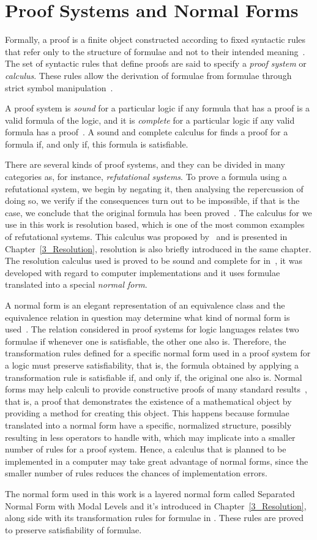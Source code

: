\section{Proof Systems and Normal Forms}

Formally, a proof is a finite object constructed according
to fixed syntactic rules that refer only to the structure of formulae and not to
their intended meaning~\cite{fitting}. The set of syntactic rules that define
proofs are said to specify a \emph{proof system} or \emph{calculus}. These rules
allow the derivation of formulae from formulae through strict symbol
manipulation~\cite{resolutionbased}.

A proof system is \emph{sound} for a particular logic if any formula that has a
proof is a valid formula of the logic, and it is \emph{complete} for a
particular logic if any valid formula has a proof~\cite{fitting}. A sound and
complete calculus for  finds a proof for a formula if, and only
if, this formula is satisfiable.

There are several kinds of proof systems, and they can be divided in many
categories as, for instance, \emph{refutational systems}. To prove a formula
using a refutational system, we begin by negating it, then analysing the
repercussion %
of doing so, we verify if the consequences turn out to be impossible, if that is
the case, we conclude that the original formula has been proved~\cite{fitting}.
The calculus for  we use in this work is resolution based,
which is one of the most common examples of refutational systems. This calculus
was proposed by~\cite{nalon2015modal} and is presented in
Chapter~\ref{3_Resolution}, resolution is also briefly introduced in the same
chapter. The resolution calculus used is proved to be sound and complete for
 in~\cite{nalon2015modal}, it was developed with regard to
computer implementations and it uses formulae translated into a special
\emph{normal form}.

A normal form is an elegant representation of an equivalence class and the
equivalence relation in question may determine what kind of normal form is
used~\cite{normalformtheory}. The relation considered in proof systems for logic
languages relates two formulae if whenever one is satisfiable, the other one
also is. Therefore, the transformation rules defined for a specific normal form
used in a proof system for a logic must preserve satisfiability, that is, the
formula obtained by applying a transformation rule is satisfiable if, and only
if, the original one also is. Normal forms may help calculi to provide constructive
proofs of many standard results~\cite{fine1975}, that is, a proof that
demonstrates the existence of a mathematical object by providing a method for
creating this object. This happens because formulae translated into a normal
form have a specific, normalized structure, possibly resulting in less operators
to handle with, which may implicate into a smaller number of rules for a proof
system. Hence, a calculus that is planned to be implemented in a computer may
take great advantage of normal forms, since the smaller number of rules reduces
the chances of implementation errors. 

The normal form used in this work is a layered normal form called Separated
Normal Form with Modal Levels and it's introduced in Chapter~\ref{3_Resolution},
along side with its transformation rules for formulae in . These
rules are proved to preserve satisfiability of formulae. 
